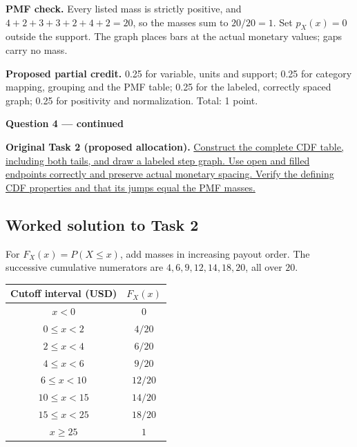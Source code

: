 \textbf{PMF check.} Every listed mass is strictly positive, and $4+2+3+3+2+4+2=20$, so the masses sum to $20/20=1$. Set $p_X(x)=0$ outside the support. The graph places bars at the actual monetary values; gaps carry no mass.

\textbf{Proposed partial credit.} 0.25 for variable, units and support; 0.25 for category mapping, grouping and the PMF table; 0.25 for the labeled, correctly spaced graph; 0.25 for positivity and normalization. Total: 1 point.

\par\vspace{3mm}\secInicio[][sec:q4]

\clearpage
\textbf{Question 4 --- continued}

\textbf{Original Task 2 (proposed allocation).} \hyperref[sol:q4t2]{Construct the complete CDF table, including both tails, and draw a labeled step graph. Use open and filled endpoints correctly and preserve actual monetary spacing. Verify the defining CDF properties and that its jumps equal the PMF masses.} 


\subsection*{Worked solution to Task 2 }
\label{sol:q4t2}

For $F_X(x)=P(X\leq x)$, add masses in increasing payout order. The successive cumulative numerators are $4,6,9,12,14,18,20$, all over $20$.

\begin{center}
\begin{tabular}{cc}\toprule
Cutoff interval (USD) & $F_X(x)$\\\midrule
$x<0$ & $0$\\
$0\leq x<2$ & $4/20$\\
$2\leq x<4$ & $6/20$\\
$4\leq x<6$ & $9/20$\\
$6\leq x<10$ & $12/20$\\
$10\leq x<15$ & $14/20$\\
$15\leq x<25$ & $18/20$\\
$x\geq 25$ & $1$\\
\bottomrule\end{tabular}
\end{center}


